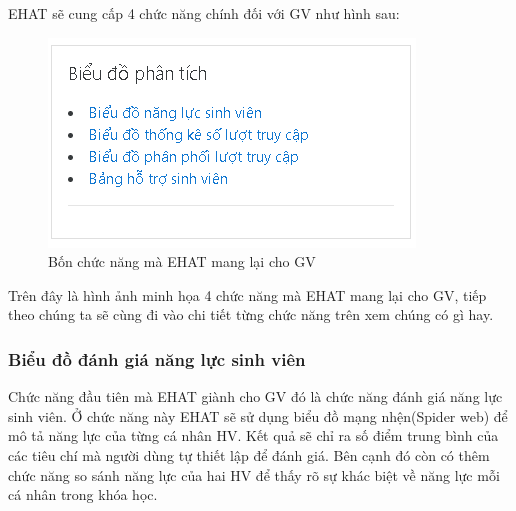 EHAT sẽ cung cấp 4 chức năng chính đối với GV như hình sau:

\begin{center}
	\begin{figure}[htp]
		\begin{center}
			\includegraphics[scale=1]{img/gvtool}
		\end{center}
		\caption{Bốn chức năng mà EHAT mang lại cho GV}
		\label{refhinh27}
	\end{figure}
\end{center}

Trên đây là hình ảnh minh họa 4 chức năng mà EHAT mang lại cho GV, tiếp theo chúng ta sẽ cùng đi vào chi tiết từng chức năng trên xem chúng có gì hay.

\subsubsection{Biểu đồ đánh giá năng lực sinh viên}
Chức năng đầu tiên mà EHAT giành cho GV đó là chức năng đánh giá năng lực sinh viên. Ở chức năng này EHAT sẽ sử dụng biểu đồ mạng nhện(Spider web) để mô tả năng lực của từng cá nhân HV. Kết quả sẽ chỉ ra số điểm trung bình của các tiêu chí mà người dùng tự thiết lập để đánh giá. Bên cạnh đó còn có thêm chức năng so sánh năng lực của hai HV để thấy rõ sự khác biệt về năng lực mỗi cá nhân trong khóa học.

